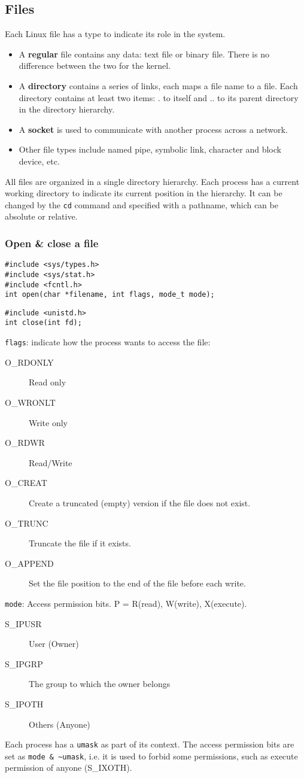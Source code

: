 \subsection{Files}
Each Linux file has a type to indicate its role in the system. 
\begin{itemize}
\item A \textbf{regular} file contains any data: text file or binary file. There is no difference between the two for the kernel. 
\item A \textbf{directory} contains a series of links, each maps a file name to a file. Each directory contains at least two items: . to itself and .. to its parent directory in the directory hierarchy. 
\item A \textbf{socket} is used to communicate with another process across a network. 
\item Other file types include named pipe, symbolic link, character and block device, etc. 
\end{itemize}
All files are organized in a single directory hierarchy. Each process has a current working directory to indicate its current position in the hierarchy. It can be changed by the \texttt{cd} command and specified with a pathname, which can be absolute or relative. 
\subsubsection{Open \& close a file}
\begin{lstlisting}[frame = single]
#include <sys/types.h>
#include <sys/stat.h>
#include <fcntl.h>
int open(char *filename, int flags, mode_t mode);
\end{lstlisting}
\begin{lstlisting}[frame = single]
#include <unistd.h>
int close(int fd);
\end{lstlisting}
\texttt{flags}: indicate how the process wants to access the file:
\begin{description}
	\item[O\_RDONLY] Read only
	\item[O\_WRONLT] Write only
	\item[O\_RDWR] Read/Write
	\item[O\_CREAT] Create a truncated (empty) version if the file does not exist.
	\item[O\_TRUNC] Truncate the file if it exists.
	\item[O\_APPEND] Set the file position to the end of the file before each write.
\end{description}
\texttt{mode}: Access permission bits. P = R(read), W(write), X(execute).
\begin{description}
	\item[S\_IPUSR] User (Owner)
	\item[S\_IPGRP] The group to which the owner belongs
	\item[S\_IPOTH] Others (Anyone)
\end{description}
Each process has a \texttt{umask} as part of its context. The access permission bits are set as \texttt{mode \& {\textasciitilde}umask}, i.e. it is used to forbid some permissions, such as execute permission of anyone (S\_IXOTH).
